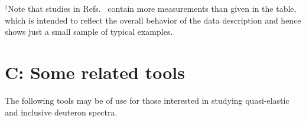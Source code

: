 $^\dag$\footnotesize {\centering Note that studies in Refs.~\cite{Goitein:1970pz,Sill:1992qw,Christy:2004rc} contain more measurements than given in the table, which is intended to reflect the overall behavior of the data description and hence shows just a small sample of typical examples.}
\normalsize 
\newpage




\renewcommand{\thesection}{C}
    \makeatletter
   \renewcommand{\theequation}{\thesection.\@arabic\c@equation}
    \makeatother
\section*{C: Some related tools}
\label{app_tools}



The following tools may be of use for those interested in studying quasi-elastic and inclusive deuteron spectra.

